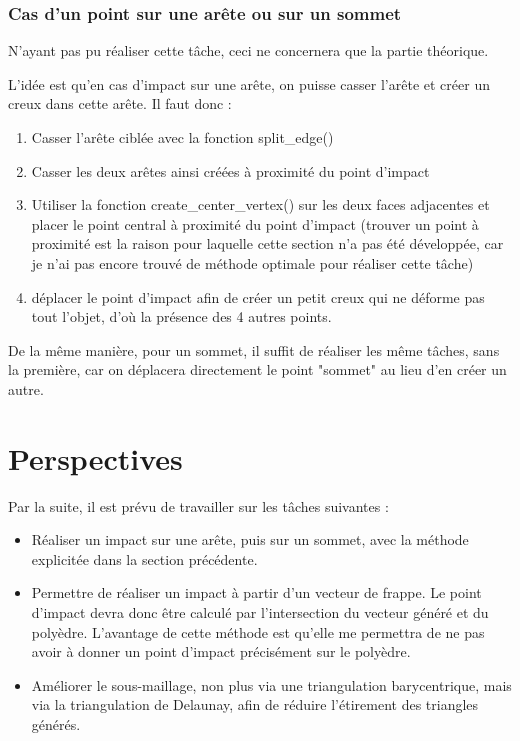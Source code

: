 \documentclass[a4paper,french]{report}
\begin{document}
			\subsection{Cas d'un point sur une arête ou sur un sommet}
				N'ayant pas pu réaliser cette tâche, ceci ne concernera que la partie théorique. \par 
				L'idée est qu'en cas d'impact sur une arête, on puisse casser l'arête et créer un creux dans cette arête. Il faut donc :
				\begin{enumerate}
					\item Casser l'arête ciblée avec la fonction split\_edge()
					\item Casser les deux arêtes ainsi créées à proximité du point d'impact
					\item Utiliser la fonction create\_center\_vertex() sur les deux faces adjacentes et placer le point central à proximité du point d'impact (trouver un point à proximité est la raison pour laquelle cette section n'a pas été développée, car je n'ai pas encore trouvé de méthode optimale pour réaliser cette tâche)
					\item déplacer le point d'impact afin de créer un petit creux qui ne déforme pas tout l'objet, d'où la présence des 4 autres points.
				\end{enumerate}
				De la même manière, pour un sommet, il suffit de réaliser les même tâches, sans la première, car on déplacera directement le point "sommet" au lieu d'en créer un autre.
	\chapter{Perspectives}
		Par la suite, il est prévu de travailler sur les tâches suivantes : 
		\begin{itemize}
			\item Réaliser un impact sur une arête, puis sur un sommet, avec la méthode explicitée dans la section précédente.
			\item Permettre de réaliser un impact à partir d'un vecteur de frappe. Le point d'impact devra donc être calculé par l'intersection du vecteur généré et du polyèdre. L'avantage de cette méthode est qu'elle me permettra de ne pas avoir à donner un point d'impact précisément sur le polyèdre.
			\item Améliorer le sous-maillage, non plus via une triangulation barycentrique, mais via la triangulation de Delaunay, afin de réduire l'étirement des triangles générés.
		\end{itemize}
		
\end{document}
